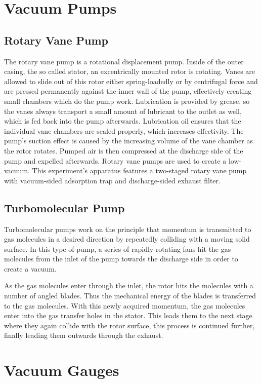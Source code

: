
\section{Vacuum Pumps}
\subsection{Rotary Vane Pump}
The rotary vane pump is a rotational displacement pump.
Inside of the outer casing, the so called stator, an excentrically mounted rotor is rotating.
Vanes are allowed to slide out of this rotor either spring-loadedly or by centrifugal force and are pressed permanently against the inner wall of the pump, effectively creating small chambers which do the pump work.
Lubrication is provided by grease, so the vanes always transport a small amount of lubricant to the outlet as well, which is fed back into the pump afterwards.
Lubrication oil ensures that the individual vane chambers are sealed properly, which increases effectivity.
The pump's suction effect is caused by the increasing volume of the vane chamber as the rotor rotates.
Pumped air is then compressed at the discharge side of the pump and expelled afterwards.
Rotary vane pumps are used to create a low-vacuum.
This experiment's apparatus features a two-staged rotary vane pump with vacuum-sided adsorption trap and discharge-sided exhaust filter.

\subsection{Turbomolecular Pump}
Turbomolecular pumps work on the principle that momentum is transmitted to gas molecules in a desired direction by repeatedly colliding with a moving solid surface.
In this type of pump, a series of rapidly rotating fans hit the gas molecules from the inlet of the pump towards the discharge side in order to create a vacuum.

As the gas molecules enter through the inlet, the rotor hits the molecules with a number of angled blades.
Thus the mechanical energy of the blades is transferred to the gas molecules.
With this newly acquired momentum, the gas molecules enter into the gas transfer holes in the stator.
This leads them to the next stage where they again collide with the rotor surface, this process is continued further, finally leading them outwards through the exhaust.

\section{Vacuum Gauges}
